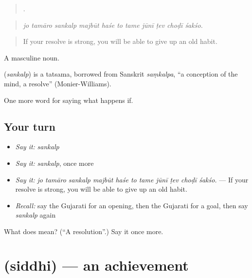 \begin{quote}
          .
\end{quote}

\begin{quote}
\emph{jo tamāro sankalp majbūt haśe to tame jūnī ṭev choḍī śakśo.}
\end{quote}

\begin{quote}
If your resolve is strong, you will be able to give up an old habit.
\end{quote}

A masculine noun.

\begin{cousinweb}
\textbf{} (\emph{sankalp}) is a tatsama, borrowed from Sanskrit \emph{saṃkalpa}, \textquotedblleft{}a conception of the mind, a resolve\textquotedblright{} (Monier-Williams).
\end{cousinweb}

\begin{grammarlens}[title={What you've built}]
One more word for saying what happens if.
\end{grammarlens}

\subsection*{Your turn}
\begin{itemize}
\raggedright
  \item \emph{Say it:} \emph{sankalp}
  \item \emph{Say it:} \emph{sankalp}, once more
  \item \emph{Say it:} \emph{jo tamāro sankalp majbūt haśe to tame jūnī ṭev choḍī śakśo.} — If your resolve is strong, you will be able to give up an old habit.
  \item \emph{Recall:} say the Gujarati for an opening, then the Gujarati for a goal, then say \emph{sankalp} again
\end{itemize}

\begin{tcolorbox}[breakable,colback=teal!4,colframe=teal!35!black,title={Before you move on}]
What does  mean? (\textquotedblleft{}A resolution\textquotedblright{}.) Say it once more.
\end{tcolorbox}
\section[\texorpdfstring{\gu{સિદ્ધિ} (siddhi)}{સિદ્ધિ (siddhi)}]{ (siddhi) — an achievement}

